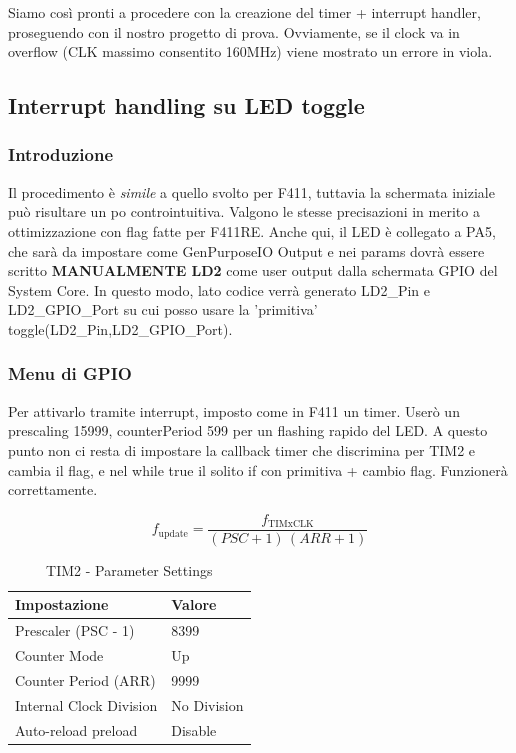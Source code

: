 Siamo così pronti a procedere con la creazione del timer + interrupt handler, proseguendo con il nostro progetto di prova. Ovviamente, se il clock va in overflow (CLK massimo consentito 160MHz) viene mostrato un errore in viola.


\subsection{Interrupt handling su LED toggle}

\subsubsection{Introduzione}
Il procedimento è \textit{simile} a quello svolto per F411, tuttavia la schermata iniziale può risultare un po controintuitiva. Valgono le stesse precisazioni in merito a ottimizzazione con flag fatte per F411RE. Anche qui, il LED è collegato a PA5, che sarà da impostare come GenPurposeIO Output e nei params dovrà essere scritto \textbf{MANUALMENTE LD2} come user output dalla schermata GPIO del System Core. In questo modo, lato codice verrà generato LD2\_Pin e LD2\_GPIO\_Port su cui posso usare la 'primitiva' toggle(LD2\_Pin,LD2\_GPIO\_Port).

\subsubsection{Menu di GPIO}
Per attivarlo tramite interrupt, imposto come in F411 un timer. Userò un prescaling 15999, counterPeriod 599 per un flashing rapido del LED. A questo punto non ci resta di impostare la callback timer che discrimina per TIM2 e cambia il flag, e nel while true il solito if con primitiva + cambio flag. Funzionerà correttamente. 

\[
f_{\text{update}} = \frac{f_{\mathrm{TIMxCLK}}}{(PSC + 1)\,(ARR + 1)}
\]

\begin{table}[h]
\centering
\begin{tabular}{l l}
Impostazione & Valore \\
\midrule
Prescaler (PSC - 1) & 8399 \\
Counter Mode & Up \\
Counter Period (ARR) & 9999 \\
Internal Clock Division & No Division \\
Auto-reload preload & Disable \\
\bottomrule
\end{tabular}
\caption{TIM2 - Parameter Settings}
\end{table}

